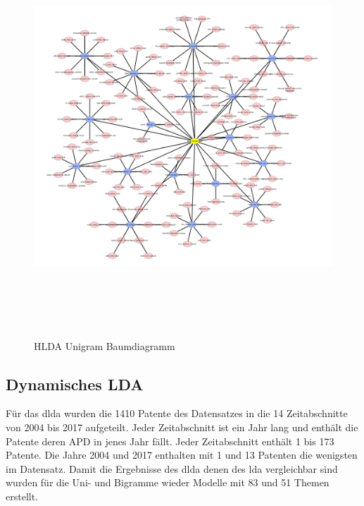\begin{figure}[htpb]
	\centering
	\includegraphics[height=15cm,width=\textwidth,keepaspectratio=true]{img/tree.png}
	\caption{
		HLDA Unigram Baumdiagramm
	}
	\label{fig:HLDA_Unigram_Baum}
\end{figure}

\subsection{Dynamisches LDA}

Für das \gls{dlda} wurden die 1410 Patente des Datensatzes in die 14 Zeitabschnitte von 2004 bis 2017 aufgeteilt. Jeder Zeitabschnitt ist ein Jahr lang und enthält die Patente deren APD in jenes Jahr fällt. Jeder Zeitabschnitt enthält 1 bis 173 Patente. Die Jahre 2004 und 2017 enthalten mit 1 und 13 Patenten die wenigsten im Datensatz. Damit die Ergebnisse des \gls{dlda} denen des \gls{lda} vergleichbar sind wurden für die Uni- und Bigramme wieder Modelle mit 83 und 51 Themen erstellt.



